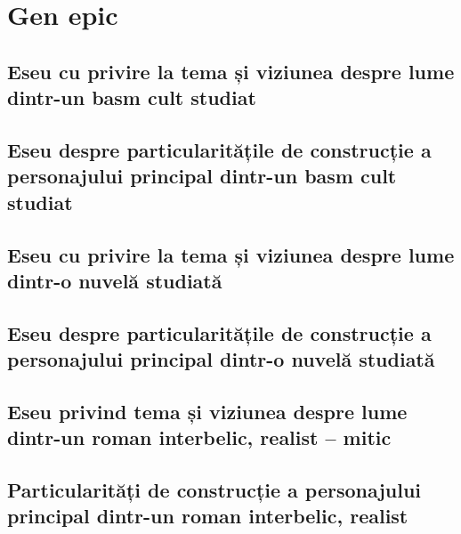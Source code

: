 \documentclass[
 12pt,                       %
 a4paper                     %
]{book}
\begin{document}




\part{Gen epic}


\chapter{Eseu cu privire la tema și viziunea despre lume dintr-un basm cult studiat}


\chapter{Eseu despre particularitățile de construcție a personajului principal dintr-un basm cult studiat}



\chapter{Eseu cu privire la tema și viziunea despre lume dintr-o nuvelă studiată}


\chapter{Eseu despre particularitățile de construcție a personajului principal dintr-o nuvelă studiată}



\chapter{Eseu privind tema și viziunea despre lume dintr-un roman interbelic, realist -- mitic}


\chapter{Particularități de construcție a personajului principal din\-tr-un roman interbelic, realist}

\end{document}
